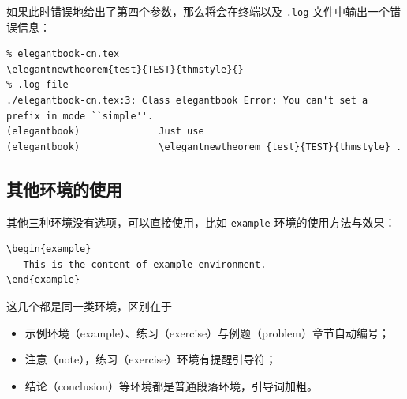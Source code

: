 \documentclass[lang=cn,newtx,10pt,scheme=chinese]{elegantbook}
\begin{document}
\begin{itemize}
  如果此时错误地给出了第四个参数，那么将会在终端以及 \verb|.log| 文件中输出一个错误信息：
\begin{lstlisting}
% elegantbook-cn.tex
\elegantnewtheorem{test}{TEST}{thmstyle}{}
% .log file
./elegantbook-cn.tex:3: Class elegantbook Error: You can't set a prefix in mode ``simple''.
(elegantbook)              Just use 
(elegantbook)              \elegantnewtheorem {test}{TEST}{thmstyle} .
\end{lstlisting}

\end{itemize}

\subsection{其他环境的使用}

其他三种环境没有选项，可以直接使用，比如 \lstinline{example} 环境的使用方法与效果：
\begin{lstlisting}
\begin{example}
   This is the content of example environment.
\end{example}
\end{lstlisting}

这几个都是同一类环境，区别在于

\begin{itemize}
  \item 示例环境（example）、练习（exercise）与例题（problem）章节自动编号；
  \item 注意（note），练习（exercise）环境有提醒引导符；
  \item 结论（conclusion）等环境都是普通段落环境，引导词加粗。
\end{itemize}
\end{document}
